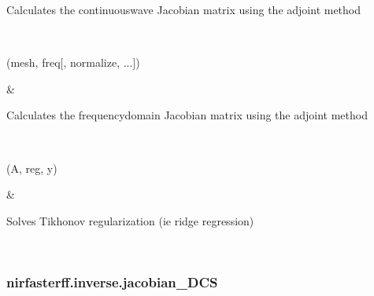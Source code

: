 \documentclass[letterpaper,10pt,english]{sphinxmanual}
\begin{document}
\begin{savenotes}
\begin{longtable}{}
\begin{varwidth}[t]{}
\sphinxAtStartPar
Calculates the continuous\sphinxhyphen{}wave Jacobian matrix using the adjoint method
\sphinxbeforeendvarwidth
\end{varwidth}%
\\
\sphinxhline\begin{varwidth}[t]{}
\sphinxAtStartPar
{\hyperref[\detokenize{_autosummary/nirfasterff.inverse.jacobian_stnd_FD:nirfasterff.inverse.jacobian_stnd_FD}]{}}(mesh, freq{[}, normalize, ...{]})
\sphinxbeforeendvarwidth
\end{varwidth}%
&\begin{varwidth}[t]{}
\sphinxAtStartPar
Calculates the frequency\sphinxhyphen{}domain Jacobian matrix using the adjoint method
\sphinxbeforeendvarwidth
\end{varwidth}%
\\
\sphinxhline\begin{varwidth}[t]{}
\sphinxAtStartPar
{\hyperref[\detokenize{_autosummary/nirfasterff.inverse.tikhonov:nirfasterff.inverse.tikhonov}]{}}(A, reg, y)
\sphinxbeforeendvarwidth
\end{varwidth}%
&\begin{varwidth}[t]{}
\sphinxAtStartPar
Solves Tikhonov regularization (ie ridge regression)
\sphinxbeforeendvarwidth
\end{varwidth}%
\\
\sphinxbottomrule
\end{longtable}
\sphinxtableafterendhook
\sphinxatlongtableend
\end{savenotes}

\sphinxstepscope


\subsubsection{nirfasterff.inverse.jacobian\_DCS}
\label{\detokenize{_autosummary/nirfasterff.inverse.jacobian_DCS:nirfasterff-inverse-jacobian-dcs}}\label{\detokenize{_autosummary/nirfasterff.inverse.jacobian_DCS::doc}}
\end{document}

